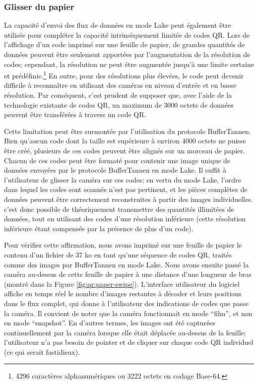 \subsubsection{Glisser du papier}\label{subsub:swipe}

La capacité d'envoi des flux de données en mode Lake peut également être utilisée pour compléter la capacité intrinsèquement limitée de codes QR. Lors de l'affichage d'un code imprimé sur une feuille de papier, de grandes quantités de données peuvent être seulement apportées par l'augmentation de la résolution de codes; cependant, la résolution ne peut être augmentée jusqu'à une limite certaine et prédéfinie.\footnote{4296 caractères alphanumériques ou 3222 octets en codage Base-64.} En outre, pour des résolutions plus élevées, le code peut devenir difficile à reconnaître en utilisant des caméras en niveau d'entrée et en basse résolution. Par conséquent, c'est prudent de supposer que, avec l'aide de la technologie existante de codes QR, un maximum de  3000 octets de données peuvent être transférées à travers un code QR.

Cette limitation peut être surmontée par l'utilisation du protocole BufferTannen. Bien qu'aucun code dont la taille est supérieure à environ 4000 octets ne puisse être créé, plusieurs de ces codes peuvent être alignés sur un morceau de papier. Chacun de ces codes peut être formaté pour contenir une image unique de données envoyées par le protocole BufferTannen en mode Lake. Il suffit à l'utilisateur de glisser la caméra sur ces codes; en vertu du mode Lake, l'ordre dans lequel les codes sont scannés n'est pas pertinent, et les pièces complètes de données peuvent être correctement reconstruites à partir des images individuelles. c'est donc possible de théoriquement transmettre des quantités illimitées de données, tout en utilisant des codes d'une résolution inférieure (cette résolution inférieure étant compensée par la présence de plus d'un code).

Pour vérifier cette affirmation, nous avons imprimé sur une feuille de papier le contenu d'un fichier de 37 ko en tant qu'une séquence de codes QR, traités comme des images par BufferTannen en mode Lake. Nous avons ensuite passé la caméra au-dessus de cette feuille de papier à une distance d'une longueur de bras (montré dans la Figure \ref{fig:qr:paper-swipe}). L'interface utilisateur du logiciel affiche en temps réel le nombre d'images restantes à décoder et leurs positions dans le flux complet, qui donne à l'utilisateur des indications de codes que passe la caméra. Il convient de noter que la caméra fonctionnait en mode ``film'', et non en mode ``snapshot''. En d'autres termes, les images ont été capturées continuellement par la caméra lorsque elle était déplacée au-dessus de la feuille; l'utilisateur n'a pas besoin de pointer et de cliquer sur chaque code QR individuel (ce qui serait fastidieux).

